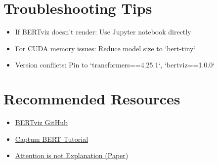 \section*{Troubleshooting Tips}
\begin{itemize}
\item If BERTviz doesn't render: Use Jupyter notebook directly
\item For CUDA memory issues: Reduce model size to `bert-tiny`
\item Version conflicts: Pin to `transformers==4.25.1`, `bertviz==1.0.0`
\end{itemize}

\section*{Recommended Resources}
\begin{itemize}
\item \href{https://github.com/jessevig/bertviz}{BERTviz GitHub}
\item \href{https://captum.ai/tutorials/Bert_SQUAD_Interpret}{Captum BERT Tutorial}
\item \href{https://arxiv.org/abs/2004.10102}{Attention is not Explanation (Paper)}
\end{itemize}